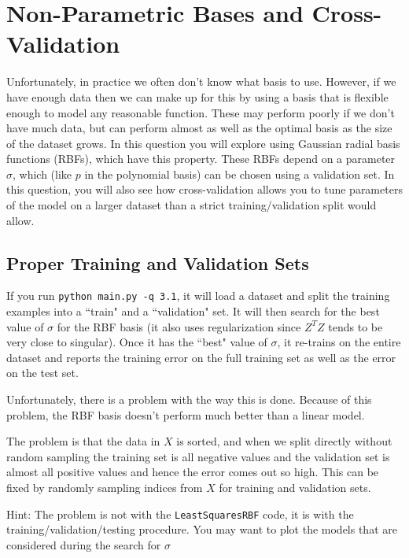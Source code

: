 \documentclass{article}
\begin{document}
\section{Non-Parametric Bases and Cross-Validation}

Unfortunately, in practice we often don't know what basis to use. 
However, if we have enough data then we can make up for this by using a basis that is flexible enough to 
model any reasonable function. These may perform poorly if we don't have much data, but can
 perform almost as well as the optimal basis as the size of the dataset grows. 
 In this question you will explore using Gaussian radial basis functions (RBFs), 
 which have this property. These RBFs depend on a parameter $\sigma$, which 
 (like $p$ in the polynomial basis) can be chosen using a validation set. 
 In this question, you will also see how cross-validation allows you to tune
 parameters of the model on a larger dataset than a strict training/validation split would allow.

\subsection{Proper Training and Validation Sets}

If you run \verb|python main.py -q 3.1|, it will load a dataset and split the training examples
 into a ``train" and a ``validation" set. It will then search for the best value of $\sigma$ 
 for the RBF basis (it also uses regularization since $Z^TZ$ tends to be very close to singular).
  Once it has the ``best" value of $\sigma$, it re-trains on the entire dataset and reports the 
  training error on the full training set as well as the error on the test set.

Unfortunately, there is a problem with the way this is done. Because of this problem, 
the RBF basis doesn't perform much better than a linear model. 

The problem is that the data in $X$ is sorted, and when we split directly without random sampling the training set is all negative values and the validation set is almost all positive values and hence the error comes out so high. This can be fixed by randomly sampling indices from $X$ for training and validation sets.

Hint: The problem is not with the \texttt{LeastSquaresRBF} code, it is with the
training/validation/testing procedure.
You may want to plot the models that are considered during the search for $\sigma$
\end{document}
